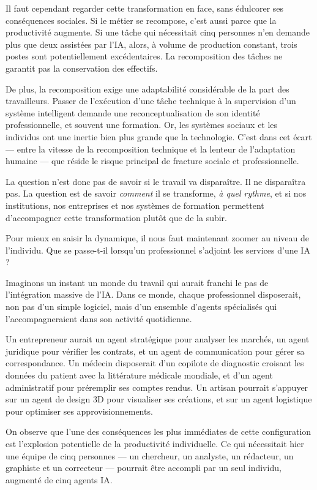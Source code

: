 Il faut cependant regarder cette transformation en face, sans édulcorer ses conséquences sociales. Si le métier se recompose, c'est aussi parce que la productivité augmente. Si une tâche qui nécessitait cinq personnes n'en demande plus que deux assistées par l'IA, alors, à volume de production constant, trois postes sont potentiellement excédentaires. La recomposition des tâches ne garantit pas la conservation des effectifs.

De plus, la recomposition exige une adaptabilité considérable de la part des travailleurs. Passer de l'exécution d'une tâche technique à la supervision d'un système intelligent demande une reconceptualisation de son identité professionnelle, et souvent une formation. Or, les systèmes sociaux et les individus ont une inertie bien plus grande que la technologie. C'est dans cet écart — entre la vitesse de la recomposition technique et la lenteur de l'adaptation humaine — que réside le risque principal de fracture sociale et professionnelle.

La question n'est donc pas de savoir si le travail va disparaître. Il ne disparaîtra pas. La question est de savoir \emph{comment} il se transforme, \emph{à quel rythme}, et si nos institutions, nos entreprises et nos systèmes de formation permettent d'accompagner cette transformation plutôt que de la subir.

Pour mieux en saisir la dynamique, il nous faut maintenant zoomer au niveau de l'individu. Que se passe-t-il lorsqu'un professionnel s'adjoint les services d'une IA ?


Imaginons un instant un monde du travail qui aurait franchi le pas de l'intégration massive de l'IA. Dans ce monde, chaque professionnel disposerait, non pas d'un simple logiciel, mais d'un ensemble d'agents spécialisés qui l'accompagneraient dans son activité quotidienne.

Un entrepreneur aurait un agent stratégique pour analyser les marchés, un agent juridique pour vérifier les contrats, et un agent de communication pour gérer sa correspondance. Un médecin disposerait d'un copilote de diagnostic croisant les données du patient avec la littérature médicale mondiale, et d'un agent administratif pour préremplir ses comptes rendus. Un artisan pourrait s'appuyer sur un agent de design 3D pour visualiser ses créations, et sur un agent logistique pour optimiser ses approvisionnements.

On observe que l'une des conséquences les plus immédiates de cette configuration est l'explosion potentielle de la productivité individuelle. Ce qui nécessitait hier une équipe de cinq personnes — un chercheur, un analyste, un rédacteur, un graphiste et un correcteur — pourrait être accompli par un seul individu, augmenté de cinq agents IA.


